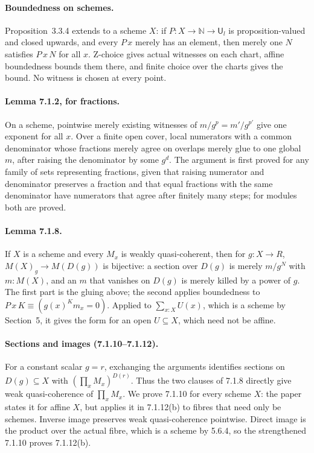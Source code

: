 \documentclass[11pt]{article}
\newcommand{\U}{\mathsf{U}}
\theoremstyle{remark}
\begin{document}
\paragraph{Boundedness on schemes.} Proposition~3.3.4 extends to a
scheme $X$: if $P:X\to\mathbb N\to\U_l$ is proposition-valued and closed
upwards, and every $P\,x$ merely has an element, then merely one $N$
satisfies $P\,x\,N$ for all $x$. Z-choice gives actual witnesses on each
chart, affine boundedness bounds them there, and finite choice over
the charts gives the bound. No witness is chosen at every point.

\paragraph{Lemma 7.1.2, for fractions.} On a scheme, pointwise merely
existing witnesses of $m/g^p=m'/g^{p'}$ give one exponent for all $x$.
Over a finite open cover, local numerators with a common denominator
whose fractions merely agree on overlaps merely glue to one global $m$,
after raising the denominator by some $g^d$. The argument is first
proved for any family of sets representing fractions, given that raising
numerator and denominator preserves a fraction and that equal fractions
with the same denominator have numerators that agree after finitely many
steps; for modules both are proved.

\paragraph{Lemma 7.1.8.} If $X$ is a scheme and every $M_x$ is weakly
quasi-coherent, then for $g:X\to R$, $M(X)_g\to M(D(g))$ is bijective:
a section over $D(g)$ is merely $m/g^N$ with $m:M(X)$, and an $m$ that
vanishes on $D(g)$ is merely killed by a power of $g$. The first part
is the gluing above; the second applies boundedness to
$P\,x\,K\equiv(g(x)^Km_x=0)$. Applied to $\sum_{x:X}U(x)$, which is a
scheme by Section~5, it gives the form for an open $U\subseteq X$, which
need not be affine.

\paragraph{Sections and images (7.1.10--7.1.12).}
For a constant scalar $g=r$, exchanging the arguments identifies sections
on $D(g)\subseteq X$ with $(\prod_x M_x)^{D(r)}$. Thus the two clauses
of 7.1.8 directly give weak quasi-coherence of $\prod_x M_x$.
We prove 7.1.10 for every scheme $X$: the paper states it for affine $X$,
but applies it in 7.1.12(b) to fibres that need only be schemes.
Inverse image preserves weak quasi-coherence pointwise. Direct image
is the product over the actual fibre, which is a scheme by 5.6.4,
so the strengthened 7.1.10 proves 7.1.12(b).
\end{document}
